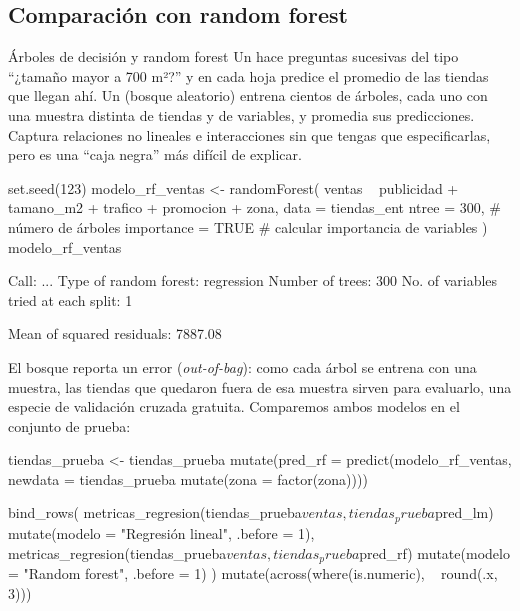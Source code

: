 \subsection{Comparación con random forest}

\begin{concepto}{Árboles de decisión y random forest}
Un  hace preguntas sucesivas del tipo ``¿tamaño
mayor a 700 m²?'' y en cada hoja predice el promedio de las tiendas que llegan
ahí. Un  (bosque aleatorio) entrena cientos de árboles,
cada uno con una muestra distinta de tiendas y de variables, y promedia sus
predicciones. Captura relaciones no lineales e interacciones sin que tengas
que especificarlas, pero es una ``caja negra'' más difícil de explicar.
\end{concepto}

\begin{rcode}
set.seed(123)
modelo_rf_ventas <- randomForest(
  ventas ~ publicidad + tamano_m2 + trafico + promocion + zona,
  data = tiendas_ent %
  ntree = 300,          # número de árboles
  importance = TRUE     # calcular importancia de variables
)
modelo_rf_ventas
\end{rcode}

\begin{rsalida}

Call:
...
               Type of random forest: regression
                     Number of trees: 300
No. of variables tried at each split: 1

          Mean of squared residuals: 7887.08
\end{rsalida}

El bosque reporta un error  (\emph{out-of-bag}): como cada árbol
se entrena con una muestra, las tiendas que quedaron fuera de esa muestra
sirven para evaluarlo, una especie de validación cruzada gratuita. Comparemos
ambos modelos en el conjunto de prueba:

\begin{rcode}
tiendas_prueba <- tiendas_prueba %
  mutate(pred_rf = predict(modelo_rf_ventas,
                           newdata = tiendas_prueba %
                             mutate(zona = factor(zona))))

bind_rows(
  metricas_regresion(tiendas_prueba$ventas, tiendas_prueba$pred_lm) %
    mutate(modelo = "Regresión lineal", .before = 1),
  metricas_regresion(tiendas_prueba$ventas, tiendas_prueba$pred_rf) %
    mutate(modelo = "Random forest", .before = 1)
) %
  mutate(across(where(is.numeric), ~ round(.x, 3)))
\end{rcode}

